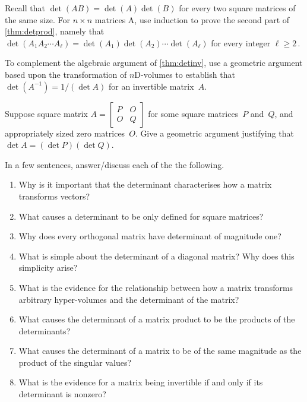 \begin{exercise} \label{ex:detprodk} 
Recall that \(\det(AB)=\det(A)\det(B)\) for every two square matrices of the same size.
For \(n\times n\) matrices \hlist A\ell, use induction to prove the second part of \autoref{thm:detprod}, namely that \(\det(A_1A_2\cdots A_\ell)=\det(A_1)\det(A_2)\cdots\det(A_\ell)\) for every integer \(\ell\geq2\)\,.
\end{exercise}






\begin{exercise} \label{ex:} 
To complement the algebraic argument of \autoref{thm:detinv}, use a geometric argument based upon the transformation of \(n\)D-volumes to establish that \(\det(A^{-1})=1/(\det A)\) for an invertible matrix~\(A\).
\end{exercise}




\begin{exercise} \label{ex:} 
Suppose square matrix \(A=\begin{bmatrix} P&O\\O&Q \end{bmatrix}\) for some square matrices~\(P\) and~\(Q\), and appropriately sized zero matrices~\(O\).
Give a geometric argument justifying that \(\det A=(\det P)(\det Q)\).
\end{exercise}




\begin{exercise} 
In a few sentences, answer\slash discuss each of the the following.
\begin{enumerate}
\item  Why is it important that the determinant characterises how a matrix transforms vectors?

\item What causes a determinant to be only defined for square matrices?

\item Why does every orthogonal matrix have determinant of magnitude one?

\item What is simple about the determinant of a diagonal matrix?  Why does this simplicity arise?

\item What is the evidence for the relationship between how a matrix transforms arbitrary hyper-volumes and the determinant of the matrix?

\item What causes the determinant of a matrix product to be the products of the determinants?

\item What causes the determinant of a matrix to be of the same magnitude as the product of the singular values?

\item What is the evidence for a matrix being invertible if and only if its determinant is nonzero?

\end{enumerate}
\end{exercise}


\begin{comment}%
why, what caused X?
how did X occur?
what-if? what-if-not?
how does X compare with Y?
what is the evidence for X?
why is X important?
\end{comment}



